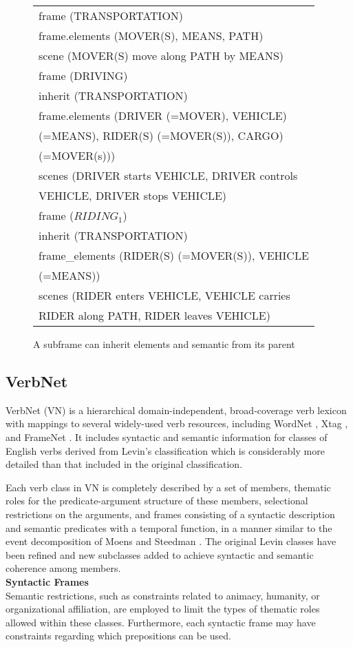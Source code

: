 \begin{figure}
\begingroup
\footnotesize
\centering
\begin{tabularx}{8cm}{l}
\hline
frame (TRANSPORTATION) \\
frame.elements (MOVER(S), MEANS, PATH)\\
scene (MOVER(S) move along PATH by MEANS)\\
\hline
frame (DRIVING)\\
inherit (TRANSPORTATION)\\
frame.elements (DRIVER (=MOVER), VEHICLE)\\
(=MEANS), RIDER(S) (=MOVER(S)), CARGO)\\
(=MOVER(s)))\\
scenes (DRIVER starts VEHICLE, DRIVER controls\\
VEHICLE, DRIVER stops VEHICLE)\\
\hline
frame ($RIDING_1$)\\
inherit (TRANSPORTATION)\\
frame\_elements (RIDER(S) (=MOVER(S)), VEHICLE\\
 (=MEANS))\\
scenes (RIDER enters VEHICLE, VEHICLE carries\\
 RIDER along PATH, RIDER leaves VEHICLE)\\
\hline
\end{tabularx}
\begin{TableCaption}
\caption{A subframe can inherit elements and semantic from its parent  \cite{baker1998berkeley}}\label{tb:framenet}
\end{TableCaption}
\endgroup
\end{figure}
\subsection{VerbNet} \label{verbnet}
VerbNet (VN) is a hierarchical domain-independent, broad-coverage verb lexicon with mappings to several widely-used verb resources, including WordNet \cite{miller1995wordnet}, Xtag \cite{prolo2002generating}, and FrameNet \cite{baker1998berkeley}. It includes syntactic and semantic information for classes of English verbs derived from Levin’s classification which is considerably more detailed than that included in the original classification. 

Each verb class in VN is completely described by a set of members, thematic roles for the predicate-argument structure of these members, selectional restrictions on the arguments, and frames consisting of a syntactic description and semantic predicates with a temporal function, in a manner similar to the event decomposition of Moens and Steedman \cite{moens2005temporal}. The original Levin classes have been refined and new subclasses added to achieve syntactic and semantic coherence among members. \\
\textbf{Syntactic Frames} \\ 
Semantic restrictions, such as constraints related to animacy, humanity, or organizational affiliation, are employed to limit the types of thematic roles allowed within these classes. Furthermore, each syntactic frame may have constraints regarding which prepositions can be used. 

